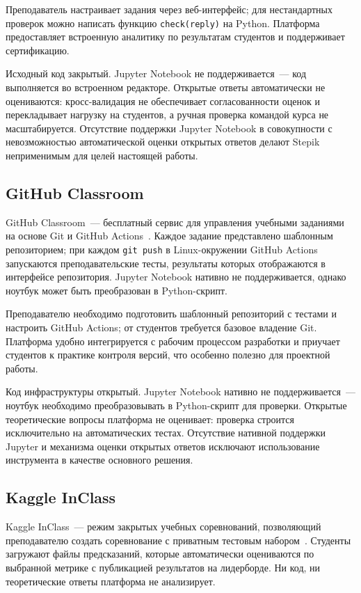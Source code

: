 Преподаватель настраивает задания через веб-интерфейс; для нестандартных
проверок можно написать функцию \texttt{check(reply)} на Python. Платформа
предоставляет встроенную аналитику по результатам студентов и поддерживает
сертификацию.

Исходный код закрытый. Jupyter Notebook не поддерживается~--- код выполняется
во встроенном редакторе. Открытые ответы автоматически не оцениваются:
кросс-валидация не обеспечивает согласованности оценок и перекладывает нагрузку
на студентов, а ручная проверка командой курса не масштабируется. Отсутствие
поддержки Jupyter Notebook в совокупности с невозможностью автоматической оценки
открытых ответов делают Stepik неприменимым для целей настоящей работы.

\subsection{GitHub Classroom}

GitHub Classroom~--- бесплатный сервис для управления учебными заданиями на
основе Git и GitHub Actions~\cite{github_classroom}. Каждое задание представлено
шаблонным репозиторием; при каждом \texttt{git push} в Linux-окружении
GitHub Actions запускаются преподавательские тесты, результаты которых
отображаются в интерфейсе репозитория. Jupyter Notebook нативно не
поддерживается, однако ноутбук может быть преобразован в Python-скрипт.

Преподавателю необходимо подготовить шаблонный репозиторий с тестами и
настроить GitHub Actions; от студентов требуется базовое владение Git.
Платформа удобно интегрируется с рабочим процессом разработки и приучает
студентов к практике контроля версий, что особенно полезно для проектной работы.

Код инфраструктуры открытый. Jupyter Notebook нативно не поддерживается~---
ноутбук необходимо преобразовывать в Python-скрипт для проверки. Открытые теоретические
вопросы платформа не оценивает: проверка строится исключительно на
автоматических тестах. Отсутствие нативной поддержки Jupyter и механизма оценки
открытых ответов исключают использование инструмента в качестве основного
решения.

\subsection{Kaggle InClass}

Kaggle InClass~--- режим закрытых учебных соревнований, позволяющий
преподавателю создать соревнование с приватным тестовым набором~\cite{kaggle_inclass}.
Студенты загружают файлы предсказаний, которые автоматически оцениваются по
выбранной метрике с публикацией результатов на лидерборде. Ни код, ни
теоретические ответы платформа не анализирует.

